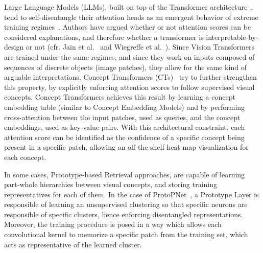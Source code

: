 Large Language Models (LLMs), built on top of the Transformer architecture~\cite{vaswani2017attention}, tend to self-disentangle their attention heads as an emergent behavior of extreme training regimes~\cite{rogers2020primer}. Authors have argued whether or not attention scores can be considered explanations, and therefore whether a transformer is interpretable-by-design or not (cfr. Jain et al.~\cite{jain2019attention} and Wiegreffe et al.~\cite{wiegreffe2019attention}). Since Vision Transformers are trained under the same regimes, and since they work on inputs composed of sequences of discrete objects (image patches), they allow for the same kind of arguable interpretations. Concept Transformers (CTs)~\cite{rigotti2021attention} try to further strengthen this property, by explicitly enforcing attention scores to follow supervised visual concepts. Concept Transformers achieves this result by learning a concept embedding table (similar to Concept Embedding Models) and by performing cross-attention between the input patches, used as queries, and the concept embeddings, used as key-value pairs. With this architectural constraint, each attention score can be identified as the confidence of a specific concept being present in a specific patch, allowing an off-the-shelf heat map visualization for each concept.

In some cases, Prototype-based Retrieval approaches, are capable of learning part-whole hierarchies between visual concepts, and storing training representatives for each of them. In the case of ProtoPNet~\cite{chen2019looks}, a Prototype Layer is responsible of learning an unsupervised clustering so that specific neurons are responsible of specific clusters, hence enforcing disentangled representations. Moreover, the training procedure is posed in a way which allows each convolutional kernel to memorize a specific patch from the training set, which acts as representative of the learned cluster.

